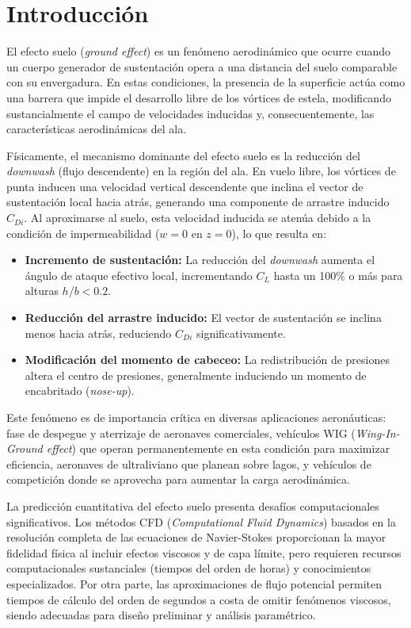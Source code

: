 \documentclass[twocolumn]{article}
\begin{document}
\section{Introducción}

El efecto suelo (\textit{ground effect}) es un fenómeno aerodinámico que ocurre cuando un cuerpo generador de sustentación opera a una distancia del suelo comparable con su envergadura. En estas condiciones, la presencia de la superficie actúa como una barrera que impide el desarrollo libre de los vórtices de estela, modificando sustancialmente el campo de velocidades inducidas y, consecuentemente, las características aerodinámicas del ala.

Físicamente, el mecanismo dominante del efecto suelo es la reducción del \textit{downwash} (flujo descendente) en la región del ala. En vuelo libre, los vórtices de punta inducen una velocidad vertical descendente que inclina el vector de sustentación local hacia atrás, generando una componente de arrastre inducido $C_{Di}$. Al aproximarse al suelo, esta velocidad inducida se atenúa debido a la condición de impermeabilidad ($w = 0$ en $z = 0$), lo que resulta en:

\begin{itemize}
    \item \textbf{Incremento de sustentación:} La reducción del \textit{downwash} aumenta el ángulo de ataque efectivo local, incrementando $C_L$ hasta un 100\% o más para alturas $h/b < 0.2$.
    \item \textbf{Reducción del arrastre inducido:} El vector de sustentación se inclina menos hacia atrás, reduciendo $C_{Di}$ significativamente.
    \item \textbf{Modificación del momento de cabeceo:} La redistribución de presiones altera el centro de presiones, generalmente induciendo un momento de encabritado (\textit{nose-up}).
\end{itemize}

Este fenómeno es de importancia crítica en diversas aplicaciones aeronáuticas: fase de despegue y aterrizaje de aeronaves comerciales, vehículos WIG (\textit{Wing-In-Ground effect}) que operan permanentemente en esta condición para maximizar eficiencia, aeronaves de ultraliviano que planean sobre lagos, y vehículos de competición donde se aprovecha para aumentar la carga aerodinámica.

La predicción cuantitativa del efecto suelo presenta desafíos computacionales significativos. Los métodos CFD (\textit{Computational Fluid Dynamics}) basados en la resolución completa de las ecuaciones de Navier-Stokes proporcionan la mayor fidelidad física al incluir efectos viscosos y de capa límite, pero requieren recursos computacionales sustanciales (tiempos del orden de horas) y conocimientos especializados. Por otra parte, las aproximaciones de flujo potencial permiten tiempos de cálculo del orden de segundos a costa de omitir fenómenos viscosos, siendo adecuadas para diseño preliminar y análisis paramétrico.
\end{document}
